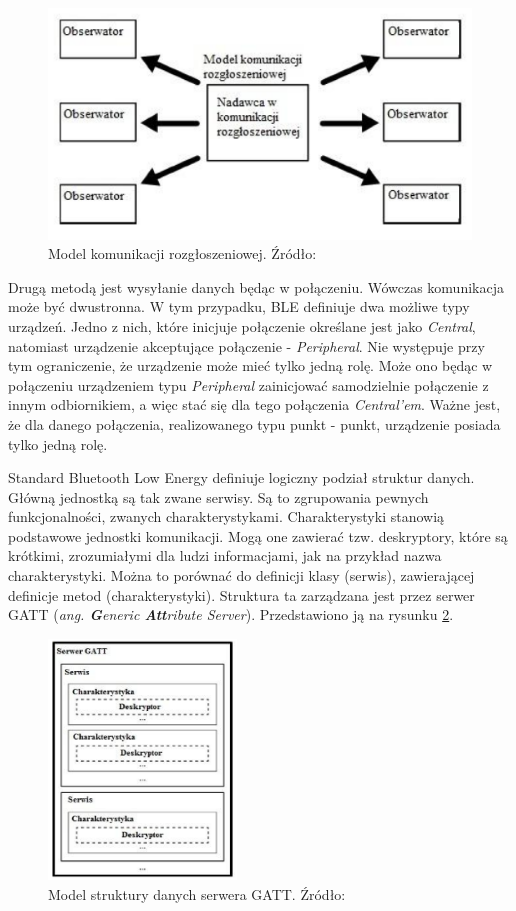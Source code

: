 \begin{figure}[H]
	\centering
	\includegraphics[width=12cm]{img/theory/BLE/ble_advertising.png}
	\caption{Model komunikacji rozgłoszeniowej. Źródło: \cite{inzynierka}}
	\label{fig:image_ble_advertising}
\end{figure}

Drugą metodą jest wysyłanie danych będąc w połączeniu. Wówczas komunikacja może być dwustronna. W tym przypadku, BLE definiuje dwa możliwe typy urządzeń. Jedno z nich, które inicjuje połączenie określane jest jako \textit{Central}, natomiast urządzenie akceptujące połączenie - \textit{Peripheral}. Nie występuje przy tym ograniczenie, że urządzenie może mieć tylko jedną rolę. Może ono będąc w połączeniu urządzeniem typu \textit{Peripheral} zainicjować samodzielnie połączenie z innym odbiornikiem, a więc stać się dla tego połączenia \textit{Central'em}. Ważne jest, że dla danego połączenia, realizowanego typu punkt - punkt, urządzenie posiada tylko jedną rolę. 

Standard Bluetooth Low Energy definiuje logiczny podział struktur danych. Główną jednostką są tak zwane serwisy. Są to zgrupowania pewnych funkcjonalności, zwanych charakterystykami. Charakterystyki stanowią podstawowe jednostki komunikacji. Mogą one zawierać tzw. deskryptory, które są krótkimi, zrozumiałymi dla ludzi informacjami, jak na przykład nazwa charakterystyki. Można to porównać do definicji klasy (serwis), zawierającej definicje metod (charakterystyki). Struktura ta zarządzana jest przez serwer GATT (\textit{ang. \textbf{G}eneric \textbf{Att}ribute Server}). Przedstawiono ją na rysunku \ref{fig:image_ble_services}. 

\begin{figure}[H]
	\centering
	\includegraphics[width=5cm]{img/theory/BLE/ble_services.png}
	\caption{Model struktury danych serwera GATT. Źródło: \cite{inzynierka}}
	\label{fig:image_ble_services}
\end{figure}

